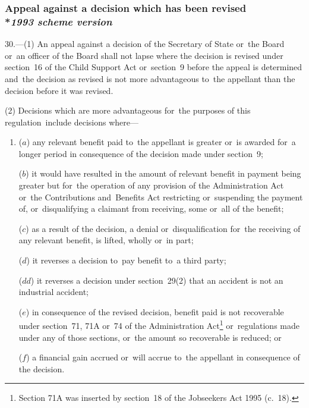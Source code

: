\documentclass[12pt,a4paper]{article}
\begin{document}
\renewcommand\parthead{--- Part~IV Chapter II}

\subsubsection[30. Appeal against a decision which has been revised --- \emph{1993 scheme version}]{Appeal against a decision which has been revised\\*\emph{1993 scheme version}}

30.—(1) An appeal against a decision of the Secretary of State
or~the Board or~an officer of the Board  %
shall not lapse where the decision is revised under section~16 of the Child Support Act or~section~9 before the appeal is determined and~the decision as revised is not more advantageous to~the appellant than the decision before it was revised.

(2) Decisions which are more advantageous for~the purposes of this regulation~include decisions where—
\begin{enumerate}\item[]
($a$) any relevant benefit paid to~the appellant is greater or~is awarded for~a longer period in consequence of the decision made under section~9;

($b$) it would have resulted in the amount of relevant benefit in payment being greater but for~the operation of any provision of the Administration Act or~the Contributions and~Benefits Act restricting or~suspending the payment of, or~disqualifying a claimant from receiving, some or~all of the benefit;

($c$) as a result of the decision, a denial or~disqualification for~the receiving of any relevant benefit, is lifted, wholly or~in part;

($d$) it reverses a decision to~pay benefit to~a third party;

($dd$) it reverses a decision under section~29(2) that an accident is not an industrial accident;

($e$) in consequence of the revised decision, benefit paid is not recoverable under section~71, 71A or~74 of the Administration Act\footnote{\frenchspacing Section 71A was inserted by section~18 of the Jobseekers Act 1995 (c.~18).} or~regulations made under any of those sections, or~the amount so recoverable is reduced; or

($f$) a financial gain accrued or~will accrue to~the appellant in consequence of the decision.
\end{enumerate}
\end{document}
